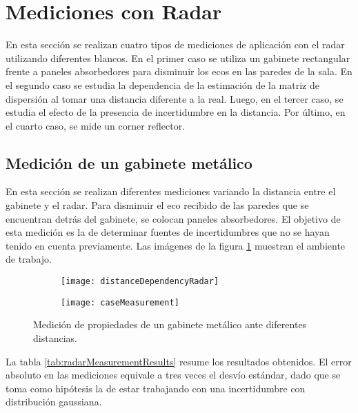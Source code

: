 \section{Mediciones con Radar}

En esta sección se realizan cuatro tipos de mediciones de aplicación con el radar utilizando diferentes blancos. En el primer caso se utiliza un gabinete rectangular frente a paneles absorbedores para disminuir los ecos en las paredes de la sala. En el segundo caso se estudia la dependencia de la estimación de la matriz de dispersión al tomar una distancia diferente a la real. Luego, en el tercer caso, se estudia el efecto de la presencia de incertidumbre en la distancia. Por último, en el cuarto caso, se mide un corner reflector.


\subsection{Medición de un gabinete metálico}

En esta sección se realizan diferentes mediciones variando la distancia entre el gabinete y el radar. Para disminuir el eco recibido de las paredes que se encuentran detrás del gabinete, se colocan paneles absorbedores. El objetivo de esta medición es la de determinar fuentes de incertidumbres que no se hayan tenido en cuenta previamente. Las imágenes de la figura \ref{fig:DistDependencySim2} muestran el ambiente de trabajo.
\begin{figure}[H]
  \centering
  \begin{subfigure}{0.59\textwidth}
    \texttt{[image: distanceDependencyRadar]}
  \end{subfigure}
  \begin{subfigure}{0.39\textwidth}
    \texttt{[image: caseMeasurement]}
  \end{subfigure}
  \caption{Medición de propiedades de un gabinete metálico ante diferentes distancias.}
  \label{fig:DistDependencySim2}
\end{figure}

La tabla \ref{tab:radarMeasurementResults} resume los resultados obtenidos. El error absoluto en las mediciones equivale a tres veces el desvío estándar, dado que se toma como hipótesis la de estar trabajando con una incertidumbre con distribución gaussiana.

